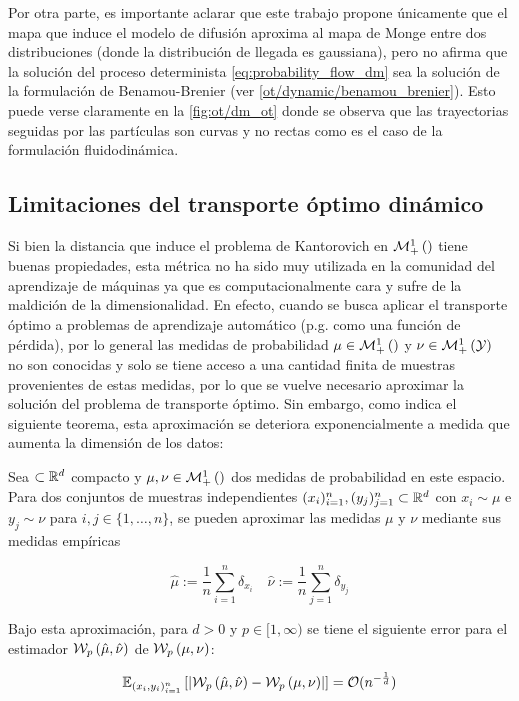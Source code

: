 Por otra parte, es importante aclarar que este trabajo propone únicamente que el mapa que induce el modelo de difusión aproxima al mapa de Monge entre dos distribuciones (donde la distribución de llegada es gaussiana), pero no afirma que la solución del proceso determinista \eqref{eq:probability_flow_dm} sea la solución de la formulación de Benamou-Brenier (ver \autoref{ot/dynamic/benamou_brenier}). Esto puede verse claramente en la \autoref{fig:ot/dm_ot} donde se observa que las trayectorias seguidas por las partículas son curvas y no rectas como es el caso de la formulación fluidodinámica.


\subsection{Limitaciones del transporte óptimo dinámico}

Si bien la distancia que induce el problema de Kantorovich en $\mathcal{M}_+^1\left(\right)$ tiene buenas propiedades, esta métrica no ha sido muy utilizada en la comunidad del aprendizaje de máquinas ya que es computacionalmente cara y sufre de la maldición de la dimensionalidad. En efecto, cuando se busca aplicar el transporte óptimo a problemas de aprendizaje automático (p.g. como una función de pérdida), por lo general las medidas de probabilidad $\mu\in\mathcal{M}_+^1\left(\right)$ y $\nu\in\mathcal{M}_+^1\left(\mathcal{Y}\right)$ no son conocidas y solo se tiene acceso a una cantidad finita de muestras provenientes de estas medidas, por lo que se vuelve necesario aproximar la solución del problema de transporte óptimo. Sin embargo, como indica el siguiente teorema, esta aproximación se deteriora exponencialmente a medida que aumenta la dimensión de los datos:

\begin{teo}[Dudley]
	Sea $\subset\mathbb{R}^d$ compacto y $\mu,\nu\in\mathcal{M}_+^1\left(\right)$ dos medidas de probabilidad en este espacio. Para dos conjuntos de muestras independientes $(x_i)_{i=1}^n, (y_j)_{j=1}^n\subset\mathbb{R}^d$ con $x_i\sim\mu$ e $y_j\sim\nu$ para $i,j\in\{1,\ldots,n\}$, se pueden aproximar las medidas $\mu$ y $\nu$ mediante sus medidas empíricas

	\begin{equation*}
		\hat{\mu} := \frac{1}{n} \sum_{i=1}^n \delta_{x_i}
		\quad
		\hat{\nu} := \frac{1}{n} \sum_{j=1}^n \delta_{y_j}
	\end{equation*}

	Bajo esta aproximación, para $d>0$ y $p\in[1,\infty)$ se tiene el siguiente error para el estimador $\mathcal{W}_{p}\left(\hat{\mu}, \hat{\nu}\right)$ de $\mathcal{W}_{p}\left(\mu,\nu\right)$:

	\begin{equation*}
		\mathbb{E}_{(x_i,y_i)_{i=1}^n}\left[\left|\mathcal{W}_{p}\left(\hat{\mu}, \hat{\nu}\right) - \mathcal{W}_{p}\left(\mu,\nu\right) \right|\right] = \mathcal{O}(n^{-\frac{1}{d}})
	\end{equation*}
\end{teo}

